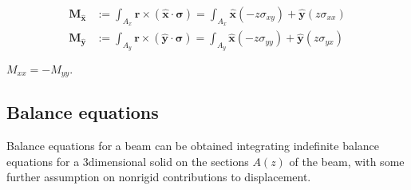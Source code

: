 \documentclass[letterpaper,10pt,english]{jupyterBook}
\begin{document}
\begin{equation*}
\begin{split}\begin{aligned}
  \mathbf{M}_{\hat{\mathbf{x}}} & := \int_{A_x} \mathbf{r} \times ( \hat{\mathbf{x}} \cdot \boldsymbol\sigma ) = \int_{A_x} \hat{\mathbf{x}} \left( -z \sigma_{xy} \right) + \hat{\mathbf{y}} \left( z \sigma_{xx} \right) \\
  \mathbf{M}_{\hat{\mathbf{y}}} & := \int_{A_y} \mathbf{r} \times ( \hat{\mathbf{y}} \cdot \boldsymbol\sigma ) = \int_{A_y} \hat{\mathbf{x}} \left( -z \sigma_{yy} \right) + \hat{\mathbf{y}} \left( z \sigma_{yx} \right) \\
\end{aligned}\end{split}
\end{equation*}
\sphinxAtStartPar
{} \(M_{xx} = - M_{yy}\).


\subsection{Balance equations}
\label{\detokenize{ch/solids/plates-shells/timoshenko:balance-equations}}\label{\detokenize{ch/solids/plates-shells/timoshenko:solid-mechanics-small-displacements-plates-shells-kirchhoff-balance-equations}}
\sphinxAtStartPar
Balance equations for a beam can be obtained integrating indefinite balance equations for a 3\sphinxhyphen{}dimensional solid on the sections \(A(z)\) of the beam, with some further assumption on non\sphinxhyphen{}rigid contributions to displacement.
\end{document}
